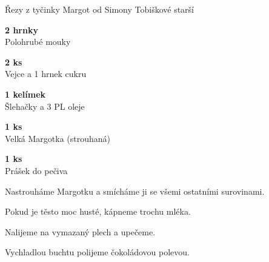 \documentclass[11pt,a4paper]{article}
\begin{document}
\begin{recipe}[DeepPink]{Řezy z tyčinky Margot od Simony Tobiškové starší}
    \begin{ingredients}
        \item \parbox[t]{\linewidth}{\raggedright \piece \textbf{2 hrnky}\\ Polohrubé mouky}
        \item \parbox[t]{\linewidth}{\raggedright \piece \textbf{2 ks}\\ Vejce a 1 hrnek cukru}
        \item \parbox[t]{\linewidth}{\raggedright \liquid \textbf{1 kelímek}\\ Šlehačky a 3 PL oleje}
        \item \parbox[t]{\linewidth}{\raggedright \piece \textbf{1 ks}\\ Velká Margotka (strouhaná)}
        \item \parbox[t]{\linewidth}{\raggedright \piece \textbf{1 ks}\\ Prášek do pečiva}
    \end{ingredients}
    \begin{steps}
        \item Nastrouháme Margotku a smícháme ji se všemi ostatními surovinami.
        \item Pokud je těsto moc husté, kápneme trochu mléka.
        \item Nalijeme na vymazaný plech a upečeme.
        \item Vychladlou buchtu polijeme čokoládovou polevou.
    \end{steps}
\end{recipe}
\end{document}
